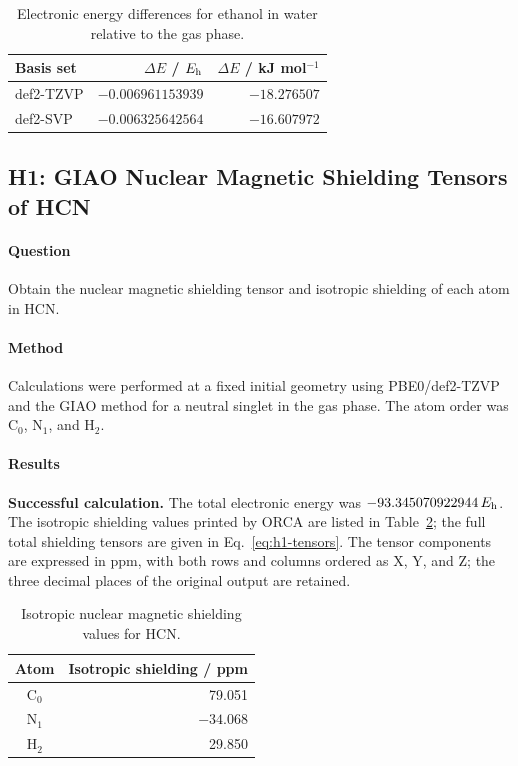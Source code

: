 \begin{table}[H]
  \centering\small
  \caption{Electronic energy differences for ethanol in water relative to the gas phase.}
  \label{tab:t5-differences}
  \begin{tabular}{lrr}
    \toprule
    Basis set & $\Delta E$ / $E_{\mathrm h}$ & $\Delta E$ / kJ mol$^{-1}$\\
    \midrule
    def2-TZVP & $-0.006961153939$ & $-18.276507$\\
    def2-SVP & $-0.006325642564$ & $-16.607972$\\
    \bottomrule
  \end{tabular}
\end{table}

\subsection{H1: GIAO Nuclear Magnetic Shielding Tensors of HCN}
\paragraph{Question}
Obtain the nuclear magnetic shielding tensor and isotropic shielding of each atom in HCN.

\paragraph{Method}
Calculations were performed at a fixed initial geometry using PBE0/def2-TZVP and the GIAO method for a neutral singlet in the gas phase.
The atom order was C$_0$, N$_1$, and H$_2$.

\paragraph{Results}
\textbf{Successful calculation.} The total electronic energy was $-93.345070922944\,E_{\mathrm h}$.
The isotropic shielding values printed by ORCA are listed in Table~\ref{tab:h1-isotropic}; the full total shielding tensors are given in Eq.~\eqref{eq:h1-tensors}.
The tensor components are expressed in ppm, with both rows and columns ordered as X, Y, and Z; the three decimal places of the original output are retained.

\begin{table}[H]
  \centering\small
  \caption{Isotropic nuclear magnetic shielding values for HCN.}
  \label{tab:h1-isotropic}
  \begin{tabular}{cr}
    \toprule
    Atom & Isotropic shielding / ppm\\
    \midrule
    C$_0$ & 79.051\\
    N$_1$ & $-34.068$\\
    H$_2$ & 29.850\\
    \bottomrule
  \end{tabular}
\end{table}

